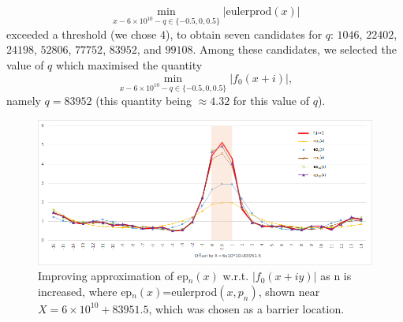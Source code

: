 $$ \min_{x - 6 \times 10^{10} - q \in \{-0.5,0,0.5\}} |\mathrm{eulerprod}(x)|$$
exceeded a threshold (we chose $4$), to obtain seven candidates for $q$: $1046$, $22402$, $24198$, $52806$, $77752$, $83952$, and $99108$.  Among these candidates, we selected the value of $q$ which maximised the quantity
$$ \min_{x - 6 \times 10^{10} - q \in \{-0.5,0,0.5\}} |f_0(x+i)|,$$
namely $q = 83952$ (this quantity being $\approx 4.32$ for this value of $q$).
\begin{figure}[h!]
  \includegraphics[width=\linewidth]{euler_product_approximation.png}
  \caption{Improving approximation of ep$_n(x)$ w.r.t. $|f_0(x+iy)|$ as n is increased, where ep$_n(x)$=eulerprod$(x,p_n)$, shown near $X=6 \times 10^{10} + 83951.5$, which was chosen as a barrier location.}
	\label{euler}
\end{figure}

